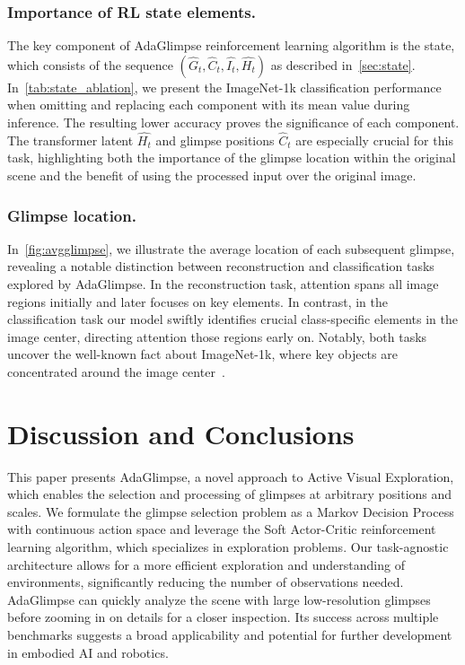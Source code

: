 \documentclass[runningheads]{llncs}
\newcommand{\ours}[0]{AdaGlimpse}
\begin{document}
\subsubsection{Importance of RL state elements.}
\label{sec:ablation}
The key component of \ours{} reinforcement learning algorithm is the state, which consists of the sequence $(\widehat{G}_t, \widehat{C}_t, \widehat{I_t}, \widehat{H_t})$ as described in~\cref{sec:state}. In~\cref{tab:state_ablation}, we present the ImageNet-1k classification performance when omitting and replacing each component with its mean value during inference. The resulting lower accuracy proves the significance of each component. The transformer latent $\widehat{H_t}$ and glimpse positions $\widehat{C}_t$ are especially crucial for this task, highlighting both the importance of the glimpse location within the original scene and the benefit of using the processed input over the original image.




\subsubsection{Glimpse location.}
In~\cref{fig:avgglimpse}, we illustrate the average location of each subsequent glimpse, revealing a notable distinction between reconstruction and classification tasks explored by \ours{}. In the reconstruction task, attention spans all image regions initially and later focuses on key elements. In contrast, in the classification task our model swiftly identifies crucial class-specific elements in the image center, directing attention those regions early on. Notably, both tasks uncover the well-known fact about ImageNet-1k, where key objects are concentrated around the image center~\cite{DBLP:journals/corr/KummererTB14}.

\section{Discussion and Conclusions}

This paper presents \ours{}, a novel approach to Active Visual Exploration, which enables the selection and processing of glimpses at arbitrary positions and scales. We formulate the glimpse selection problem as a Markov Decision Process with continuous action space and leverage the Soft Actor-Critic reinforcement learning algorithm, which specializes in exploration problems. Our task-agnostic architecture allows for a more efficient exploration and understanding of environments, significantly reducing the number of observations needed. \ours{} can quickly analyze the scene with large low-resolution glimpses before zooming in on details for a closer inspection. Its success across multiple benchmarks suggests a broad applicability and potential for further development in embodied AI and robotics.
\end{document}
